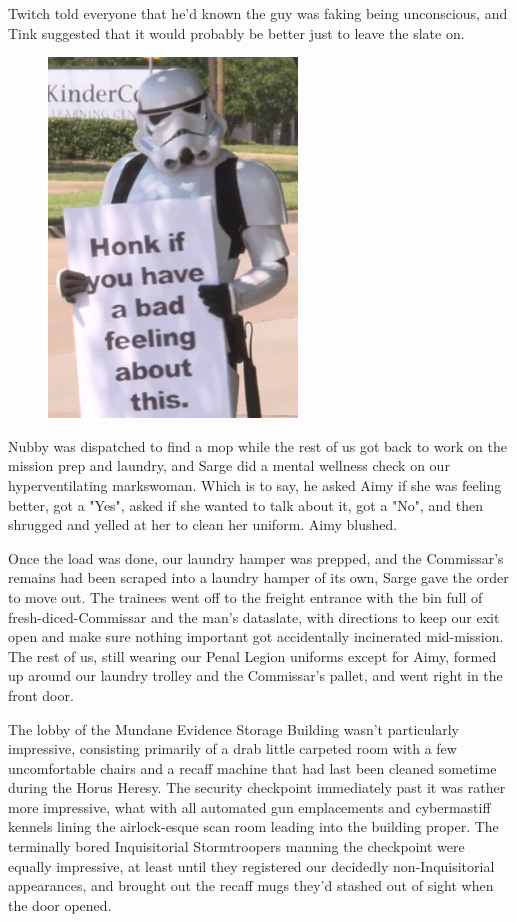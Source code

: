 Twitch told everyone that he'd known the guy was faking being unconscious, and Tink suggested that it would probably be better just to leave the slate on.

\begin{figure}
	\begin{center}
		\includegraphics[width=\figwidth]{pics/21/67.png}
	\end{center}
\end{figure}
Nubby was dispatched to find a mop while the rest of us got back to work on the mission prep and laundry, and Sarge did a mental wellness check on our hyperventilating markswoman. 
Which is to say, he asked Aimy if she was feeling better, got a "Yes", asked if she wanted to talk about it, got a "No", and then shrugged and yelled at her to clean her uniform. 
Aimy blushed.

Once the load was done, our laundry hamper was prepped, and the Commissar's remains had been scraped into a laundry hamper of its own, Sarge gave the order to move out. 
The trainees went off to the freight entrance with the bin full of fresh-diced-Commissar and the man's dataslate, with directions to keep our exit open and make sure nothing important got accidentally incinerated mid-mission. 
The rest of us, still wearing our Penal Legion uniforms except for Aimy, formed up around our laundry trolley and the Commissar's pallet, and went right in the front door.

The lobby of the Mundane Evidence Storage Building wasn't particularly impressive, consisting primarily of a drab little carpeted room with a few uncomfortable chairs and a recaff machine that had last been cleaned sometime during the Horus Heresy. 
The security checkpoint immediately past it was rather more impressive, what with all automated gun emplacements and cybermastiff kennels lining the airlock-esque scan room leading into the building proper. 
The terminally bored Inquisitorial Stormtroopers manning the checkpoint were equally impressive, at least until they registered our decidedly non-Inquisitorial appearances, and brought out the recaff mugs they'd stashed out of sight when the door opened.

